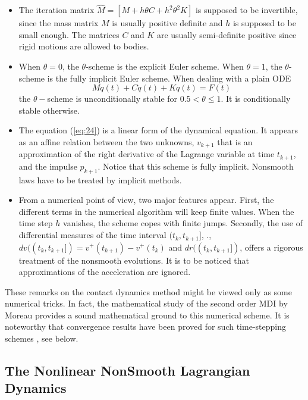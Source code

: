 \begin{itemize}

\item The iteration matrix $ \widehat{M} = \left[M+h\theta C + h^2 \theta^2 K \right] $ is supposed to be invertible, 
since the mass matrix $M$ is usually positive definite and $h$ is supposed to be small enough. 
The matrices $C$ and $K$ are  usually semi-definite positive since rigid motions are allowed to bodies.

\item  When $\theta=0$, the $\theta$-scheme is the explicit Euler scheme. When $\theta=1$, the $\theta$-scheme is the fully
implicit Euler scheme. When dealing with a plain ODE
\begin{equation}
    M\ddot{q}(t)  + C \dot{q}(t) + K q(t)  = F(t) 
\end{equation}
the $\theta-$scheme is unconditionally stable for $0.5 < \theta \leq 1$. It is conditionally stable otherwise. 


\item The equation (\ref{eq:24}) is a linear form of the dynamical equation. It appears 
as an affine relation between the two unknowns, $v_{k+1}$ that is an approximation of the right derivative of the Lagrange variable 
at time $t_{k+1}$, and the impulse $p_{k+1}$. Notice that this scheme is fully implicit. Nonsmooth laws have to be treated by implicit methods. 


\item From a numerical point of view, two major features appear. First, the different terms in 
the numerical algorithm will keep finite values. When the time step $h$ vanishes, the scheme copes with finite jumps. 
Secondly, the use of differential measures of the time interval $(t_k,t_{k+1}]$, \ie{}., 
$dv((t_{k},t_{k+1}])=v^+(t_{k+1})-v^+(t_{k})$ and $dr((t_{k},t_{k+1}])$, 
offers a rigorous treatment of the nonsmooth evolutions.  It is to be noticed that approximations of the acceleration are ignored. 

\end{itemize}

These remarks on the contact dynamics method might be viewed only as some numerical tricks. In fact, the
mathematical study of the second order MDI by Moreau provides a sound mathematical ground to this numerical scheme. 
It is noteworthy that convergence results have been proved for such time-stepping schemes \cite{Marques1993,Stewart1998,Mabrouk1998,dzonou2007}, see below.

\subsection{The Nonlinear  NonSmooth Lagrangian Dynamics}
\label{section11.1.2}

